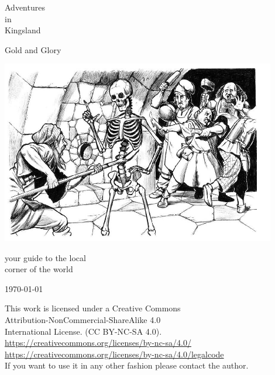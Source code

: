 \begin{center}

\huge         Adventures  \\
                  in      \\
              Kingsland   

\vspace{0.3\baselineskip}

\large      Gold and Glory

\vspace{2cm}

\includegraphics[width=120mm]{./fig/skeleton.jpg}

\vspace{2 cm}


\normalsize
          your guide to the local    \\
            corner of the world

\vfill

\today

\end{center}






\clearpage
\thispagestyle{empty}
\raggedbottom

\vsmall
\noindent 
This work is licensed under a Creative Commons \\
Attribution-NonCommercial-ShareAlike 4.0 \\
International License. (CC BY-NC-SA 4.0).\\
\url{https://creativecommons.org/licenses/by-nc-sa/4.0/} \\
\url{https://creativecommons.org/licenses/by-nc-sa/4.0/legalcode} \\
If you want to use it in any other fashion please contact the author.

